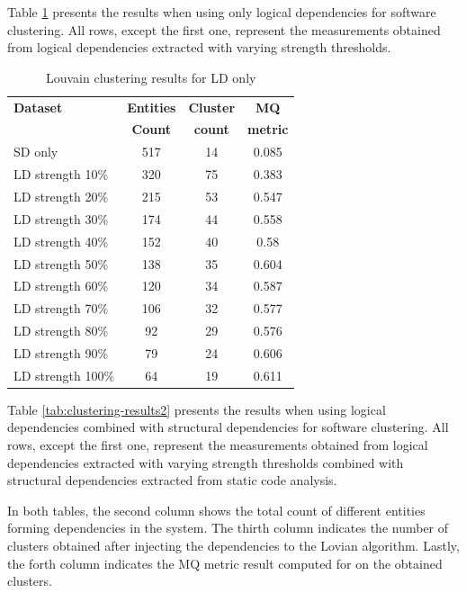 \documentclass[conference]{IEEEtran}
\begin{document}
Table \ref{tab:clustering-results1} presents the results when using only logical dependencies for software clustering. All rows, except the first one, represent the measurements obtained from logical dependencies extracted with varying strength thresholds.


\begin{table}[htbp]
  \centering
  \caption{Louvain clustering results for LD only}
  \label{tab:clustering-results1}
  \begin{tabular}{lc|c|c}
    \toprule
    \textbf{Dataset} & \textbf{Entities} & \textbf{Cluster} & \textbf{MQ } \\
    & \textbf{Count} & \textbf{count} &  \textbf{metric} \\
    \midrule
    SD only & 517 & 14 &  0.085  \\
    \midrule
LD  strength    10\%    &   320 &   75  &   0.383   \\
LD  strength    20\%    &   215 &   53  &   0.547   \\
LD  strength    30\%    &   174 &   44  &   0.558   \\
LD  strength    40\%    &   152 &   40  &   0.58    \\
LD  strength    50\%    &   138 &   35  &   0.604   \\
LD  strength    60\%    &   120 &   34  &   0.587   \\
LD  strength    70\%    &   106 &   32  &   0.577   \\
LD  strength    80\%    &   92  &   29  &   0.576   \\
LD  strength    90\%    &   79  &   24  &   0.606   \\
LD  strength    100\%   &   64  &   19  &   0.611   \\
    \bottomrule
  \end{tabular}
\end{table}


Table \ref{tab:clustering-results2} presents the results when using logical dependencies combined with structural dependencies for software clustering. All rows, except the first one, represent the measurements obtained from logical dependencies extracted with varying strength thresholds combined with structural dependencies extracted from static code analysis.

In both tables, the second column shows the total count of different entities forming dependencies in the system. The thirth column indicates the number of clusters obtained after injecting the dependencies to the Lovian algorithm. Lastly, the forth column indicates the MQ metric result computed for on the obtained clusters.
\end{document}
